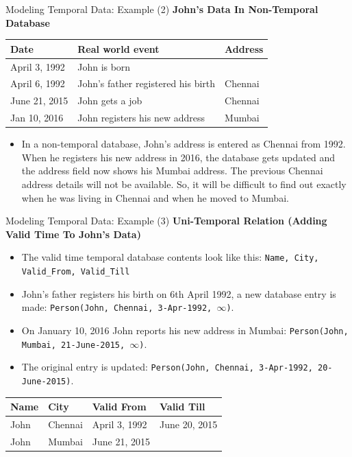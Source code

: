 \documentclass[aspectratio=169, xcolor=dvipsnames]{beamer}
\begin{document}
\begin{frame}{Modeling Temporal Data: Example (2)}
    \textbf{John's Data In Non-Temporal Database}
    \begin{table}
    \centering
    \begin{tabular}{lll}
    \toprule
    \textbf{Date} & \textbf{Real world event} & \textbf{Address} \\
    \midrule
    April 3, 1992 & John is born & \\
    April 6, 1992 & John's father registered his birth & Chennai \\
    June 21, 2015 & John gets a job & Chennai \\
    Jan 10, 2016 & John registers his new address & Mumbai \\
    \bottomrule
    \end{tabular}
    \end{table}
    \begin{itemize}[<+->]
        \item In a non-temporal database, John's address is entered as Chennai from 1992. When he registers his new address in 2016, the database gets updated and the address field now shows his Mumbai address. The previous Chennai address details will not be available. So, it will be difficult to find out exactly when he was living in Chennai and when he moved to Mumbai.
    \end{itemize}
\end{frame}

\begin{frame}{Modeling Temporal Data: Example (3)}
    \textbf{Uni-Temporal Relation (Adding Valid Time To John's Data)}
    \begin{itemize}
        \item The valid time temporal database contents look like this: \texttt{Name, City, Valid\_From, Valid\_Till}
        \item John's father registers his birth on 6th April 1992, a new database entry is made: \texttt{Person(John, Chennai, 3-Apr-1992, $\infty$)}.
        \item On January 10, 2016 John reports his new address in Mumbai: \texttt{Person(John, Mumbai, 21-June-2015, $\infty$)}.
        \item The original entry is updated: \texttt{Person(John, Chennai, 3-Apr-1992, 20-June-2015)}.
    \end{itemize}
    \begin{table}
    \centering
    \begin{tabular}{llll}
    \toprule
    \textbf{Name} & \textbf{City} & \textbf{Valid From} & \textbf{Valid Till} \\
    \midrule
    John & Chennai & April 3, 1992 & June 20, 2015 \\
    John & Mumbai & June 21, 2015 & \\
    \bottomrule
    \end{tabular}
    \end{table}
\end{frame}
\end{document}
